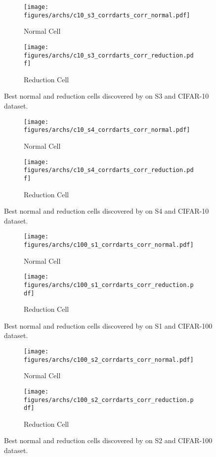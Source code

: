\documentclass{article} \usepackage{fancyhdr, iclr2023_conference, times}
\begin{document}
\begin{figure}[h]
    \centering
    \begin{subfigure}[h]{0.5\textwidth}
        \centering
        \texttt{[image: figures/archs/c10\_s3\_corrdarts\_corr\_normal.pdf]}
        \caption{Normal Cell}
    \end{subfigure}\begin{subfigure}[h]{0.5\textwidth}
        \centering
        \texttt{[image: figures/archs/c10\_s3\_corrdarts\_corr\_reduction.pdf]}
        \caption{Reduction Cell}
    \end{subfigure}
    \caption{Best normal and reduction cells discovered by  on S3 and CIFAR-10 dataset.}
\end{figure}
\begin{figure}[h]
    \centering
    \begin{subfigure}[h]{0.5\textwidth}
        \centering
        \texttt{[image: figures/archs/c10\_s4\_corrdarts\_corr\_normal.pdf]}
        \caption{Normal Cell}
    \end{subfigure}\begin{subfigure}[h]{0.5\textwidth}
        \centering
        \texttt{[image: figures/archs/c10\_s4\_corrdarts\_corr\_reduction.pdf]}
        \caption{Reduction Cell}
    \end{subfigure}
    \caption{Best normal and reduction cells discovered by  on S4 and CIFAR-10 dataset.}
\end{figure}
\begin{figure}[h]
    \centering
    \begin{subfigure}[h]{0.5\textwidth}
        \centering
        \texttt{[image: figures/archs/c100\_s1\_corrdarts\_corr\_normal.pdf]}
        \caption{Normal Cell}
    \end{subfigure}\begin{subfigure}[h]{0.5\textwidth}
        \centering
        \texttt{[image: figures/archs/c100\_s1\_corrdarts\_corr\_reduction.pdf]}
        \caption{Reduction Cell}
    \end{subfigure}
    \caption{Best normal and reduction cells discovered by  on S1 and CIFAR-100 dataset.}
\end{figure}
\begin{figure}[h]
    \centering
    \begin{subfigure}[h]{0.5\textwidth}
        \centering
        \texttt{[image: figures/archs/c100\_s2\_corrdarts\_corr\_normal.pdf]}
        \caption{Normal Cell}
    \end{subfigure}\begin{subfigure}[h]{0.5\textwidth}
        \centering
        \texttt{[image: figures/archs/c100\_s2\_corrdarts\_corr\_reduction.pdf]}
        \caption{Reduction Cell}
    \end{subfigure}
    \caption{Best normal and reduction cells discovered by  on S2 and CIFAR-100 dataset.}
\end{figure}
\end{document}
